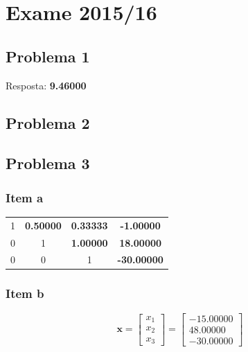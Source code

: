 \setcounter{chapter}{14}
\chapter{Exame 2015/16}
{
\renewcommand{\thesubsection}{\thesection\alph{subsection}}

\section{Problema 1}

Resposta: \textbf{9.46000}

\section{Problema 2}

\section{Problema 3}

\subsection{Item a}
\begin{center}
    \begin{tabular}{ c c c | c}
        1 & \textbf{0.50000} & \textbf{0.33333} & \textbf{-1.00000} \\
        0 & 1 & \textbf{1.00000} & \textbf{18.00000} \\
        0 & 0 & 1 & \textbf{-30.00000}
    \end{tabular}
\end{center}
\subsection{Item b}
\begin{equation*}
    \mathbf{x}
    =\begin{bmatrix} x_1 \\ x_2 \\ x_3 \end{bmatrix}
    =\begin{bmatrix} -15.00000 \\ 48.00000 \\ -30.00000 \end{bmatrix}
\end{equation*}
}
